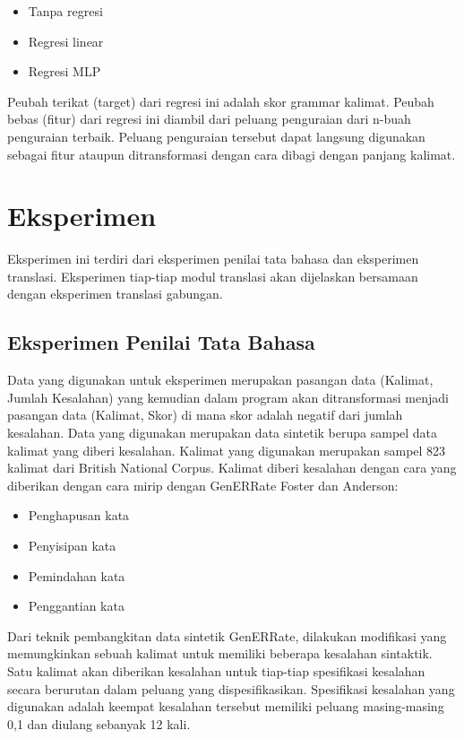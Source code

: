 \documentclass[conference]{IEEEtran}
\begin{document}
\begin{itemize}
\item Tanpa regresi
\item Regresi linear
\item Regresi MLP
\end{itemize}

Peubah terikat (target) dari regresi ini adalah skor grammar kalimat. Peubah bebas (fitur) dari regresi ini diambil dari peluang penguraian dari n-buah penguraian terbaik. Peluang penguraian tersebut dapat langsung digunakan sebagai fitur ataupun ditransformasi dengan cara dibagi dengan panjang kalimat.

\section{Eksperimen}

Eksperimen ini terdiri dari eksperimen penilai tata bahasa dan eksperimen translasi. Eksperimen tiap-tiap modul translasi akan dijelaskan bersamaan dengan eksperimen translasi gabungan.

\subsection{Eksperimen Penilai Tata Bahasa}

Data yang digunakan untuk eksperimen merupakan pasangan data (Kalimat, Jumlah Kesalahan) yang kemudian dalam program akan ditransformasi menjadi pasangan data (Kalimat, Skor) di mana skor adalah negatif dari jumlah kesalahan. 
Data yang digunakan merupakan data sintetik berupa sampel data kalimat yang diberi kesalahan. Kalimat yang digunakan merupakan sampel 823 kalimat dari British National Corpus\cite{b9}. Kalimat diberi kesalahan dengan cara yang diberikan dengan cara mirip dengan GenERRate Foster dan Anderson\cite{b10}:
\begin{itemize}
\item Penghapusan kata
\item Penyisipan kata
\item Pemindahan kata
\item Penggantian kata
\end{itemize}
Dari teknik pembangkitan data sintetik GenERRate\cite{b10}, dilakukan modifikasi yang memungkinkan sebuah kalimat untuk memiliki beberapa kesalahan sintaktik. Satu kalimat akan diberikan kesalahan untuk tiap-tiap spesifikasi kesalahan secara berurutan dalam peluang yang dispesifikasikan. Spesifikasi kesalahan yang digunakan adalah keempat kesalahan tersebut memiliki peluang masing-masing 0,1 dan diulang sebanyak 12 kali.
\end{document}
